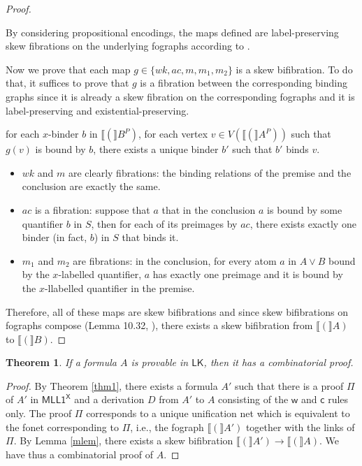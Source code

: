 \documentclass[conference,twosided,10pt]{IEEEtran}
\newtheorem{theorem_}[thm]{Theorem}
\theoremstyle{definition}
\newcommand*{\LK}{\mathsf{LK}}
\newcommand*{\FOMLL}{\mathsf{MLL1^X}}
\renewcommand\wD {\mathsf{w}}
\renewcommand\cD {\mathsf{c}}
\newcommand{\cor}{\vee}
\newcommand{\PE}[1]{#1^P}
\newcommand{\graphof}[1]{\llbracket#1\rrbracket}
\begin{document}
\begin{proof}
\begin{itemize}
\end{itemize}

By considering propositional encodings, the maps defined are label-preserving
skew fibrations on the underlying fographs according to
\cite{str:07:RTA}.

Now we prove that each map $g \in \{wk, ac, m, m_1, m_2 \}$ is a skew bifibration. To do that, it suffices to prove that $g$ is a fibration between the corresponding binding graphs since it is already a skew fibration on the corresponding fographs and it is label-preserving and existential-preserving.
\begin{center}
for each $x$-binder $b$ in $\graphof(\PE{B})$, for each vertex $v \in V(\graphof(\PE{A}))$
such that $g(v)$ is bound by $b$, there exists a unique binder $b'$ such
that $b'$ binds $v$.
\end{center}

\begin{itemize}
  \item $wk$ and $m$ are clearly fibrations: the binding relations of the premise and the conclusion are exactly the same.
  \item $ac$ is a fibration: suppose that $a$ that in the conclusion $a$ is bound by some quantifier $b$ in $S$, then for each of its preimages by $ac$, there exists exactly one binder (in fact, $b$) in $S$ that binds it.
  \item $m_1$ and $m_2$ are fibrations: in the conclusion, for every atom $a$ in $A \cor B$ bound by the $x$-labelled quantifier, $a$ has exactly one preimage and it is bound by the $x$-llabelled quantifier in the premise.
\end{itemize}

  Therefore, all of these maps are skew bifibrations and since skew bifibrations
on fographs compose (Lemma 10.32, \cite{hughes:fopws}), there exists a skew
bifibration from $\graphof(A)$ to $\graphof(B)$.

\end{proof}

\begin{theorem_}
If a formula $A$ is provable in $\LK$, then it has a combinatorial proof.
\end{theorem_}

\begin{proof}
By Theorem \ref{thm1}, there exists a formula $A'$ such that there is a proof
$\Pi$ of $A'$ in $\FOMLL$ and a derivation $D$ from $A'$ to $A$ consisting of
the $\wD$ and $\cD$ rules only. The proof $\Pi$ corresponds to a unique
unification net which is equivalent to the fonet corresponding to $\Pi$, i.e.,
the fograph $\graphof(A')$ together with the links of $\Pi$. By Lemma \ref{mlem}, 
there exists a skew bifibration $\graphof(A') \rightarrow \graphof(A)$. We have thus a
combinatorial proof of $A$.

\end{proof}
\end{document}
